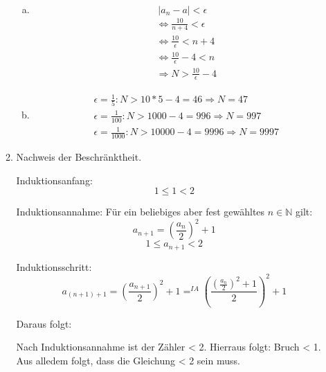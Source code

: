 \documentclass[a4paper]{scrartcl}
\begin{document}
\begin{enumerate}
\begin{enumerate}[1)]
\begin{enumerate}[a)]
\item
\[ | a_n - a | < \epsilon \]
\begin{align}
&\Leftrightarrow \frac {10} {n+4} < \epsilon\\
&\Leftrightarrow \frac {10} \epsilon < n+4\\
&\Leftrightarrow \frac {10} \epsilon -4 < n\\
&\Rightarrow N > \frac {10} \epsilon -4
\end{align}

\item
\begin{align}
&\epsilon = \frac 1 5 : N > 10*5-4 = 46 \Rightarrow N = 47\\
&\epsilon = \frac 1 {100} : N > 1000-4 = 996 \Rightarrow N = 997\\
&\epsilon = \frac 1 {1000} : N > 10000-4 = 9996 \Rightarrow N = 9997 
\end{align}
\end{enumerate}

\newpage
\item
Nachweis der Beschränktheit.

Induktionsanfang:
\[1 \leq 1 < 2\]

Induktionsannahme:
Für ein beliebiges aber fest gewähltes \( n \in \mathbb{N}\) gilt:
\[ a_{n+1} = (\frac {a_n} 2)^2 + 1\]
\[ 1 \leq a_{n+1} < 2 \]

Induktionsschritt:
\[a_{(n+1)+1} =  ( \frac {a_{n+1}} 2 )^2 + 1 =^{IA} (\frac {(\frac {a_n} 2)^2 + 1} 2)^2 + 1 \]

Daraus folgt:

Nach Induktionsannahme ist der Zähler < 2. Hierraus folgt: Bruch < 1.
Aus alledem folgt, dass die Gleichung < 2 sein muss.


\end{enumerate}
\end{enumerate}
\end{document}
